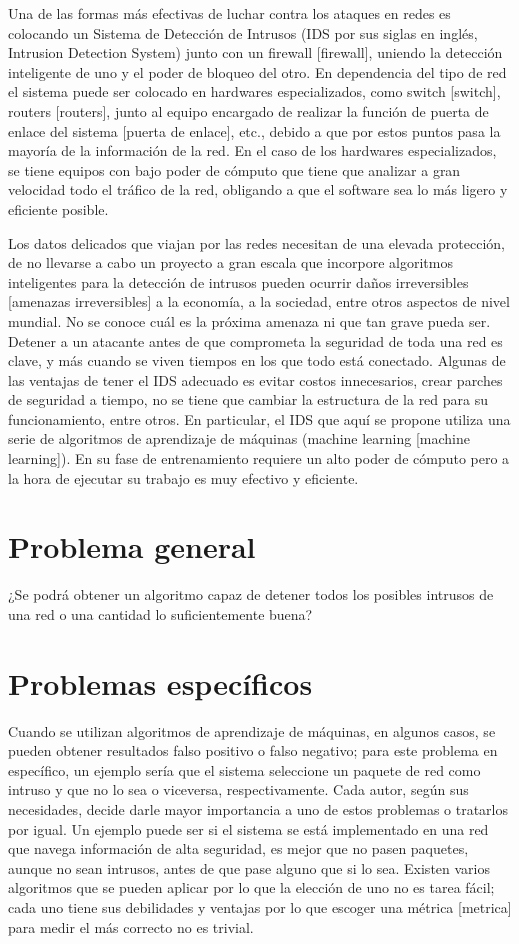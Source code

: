 Una de las formas más efectivas de luchar contra los ataques en redes es colocando un Sistema de Detección de Intrusos \cite{scarfone2012guide} (IDS por sus siglas en inglés, Intrusion Detection System) junto con un firewall [firewall], uniendo la detección inteligente de uno y el poder de bloqueo del otro. En dependencia del tipo de red el sistema puede ser colocado en hardwares especializados, como switch [switch], routers [routers], junto al equipo encargado de realizar la función de puerta de enlace del sistema [puerta de enlace],  etc., debido a que por estos puntos pasa la mayoría de la información de la red. En el caso de los hardwares especializados, se tiene equipos con bajo poder de cómputo que tiene que analizar a gran velocidad todo el tráfico de la red, obligando a que el software sea lo más ligero y eficiente posible.

Los datos delicados que viajan por las redes necesitan de una elevada protección, de no llevarse a cabo un proyecto a gran escala que incorpore algoritmos inteligentes para la detección de intrusos pueden ocurrir daños irreversibles [amenazas irreversibles] a la economía, a la sociedad, entre otros aspectos de nivel mundial. No se conoce cuál es la próxima amenaza ni que tan grave pueda ser. Detener a un atacante antes de que comprometa la seguridad de toda una red es clave, y más cuando se viven tiempos en los que todo está conectado. Algunas de las ventajas de tener el IDS adecuado es evitar costos innecesarios, crear parches de seguridad a tiempo, no se tiene que cambiar la estructura de la red para su funcionamiento, entre otros. En particular, el IDS que aquí se propone utiliza una serie de algoritmos de aprendizaje de máquinas (machine learning [machine learning]). En su fase de entrenamiento requiere un alto poder de cómputo pero a la hora de ejecutar su trabajo es muy efectivo y eficiente.

\section*{Problema general}
¿Se podrá obtener un algoritmo capaz de detener todos los posibles intrusos de una red o una cantidad lo suficientemente buena?

\section*{Problemas específicos}
Cuando se utilizan algoritmos de aprendizaje de máquinas, en algunos casos, se pueden obtener resultados falso positivo o falso negativo; para este problema en específico, un ejemplo sería que el sistema seleccione un paquete de red como intruso y que no lo sea o viceversa, respectivamente. Cada autor, según sus necesidades, decide darle mayor importancia a uno de estos problemas o tratarlos por igual. Un ejemplo puede ser si el sistema se está implementado en una red que navega información de alta seguridad, es mejor que no pasen paquetes, aunque no sean intrusos, antes de que pase alguno que si lo sea. Existen varios algoritmos que se pueden aplicar por lo que la elección de uno no es tarea fácil; cada uno tiene sus debilidades y ventajas por lo que escoger una métrica [metrica] para medir el más correcto no es trivial.

